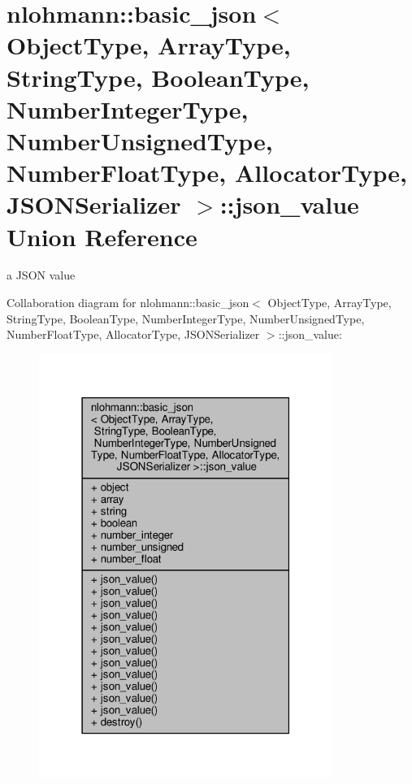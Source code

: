 \hypertarget{unionnlohmann_1_1basic__json_1_1json__value}{}\section{nlohmann\+:\+:basic\+\_\+json$<$ Object\+Type, Array\+Type, String\+Type, Boolean\+Type, Number\+Integer\+Type, Number\+Unsigned\+Type, Number\+Float\+Type, Allocator\+Type, J\+S\+O\+N\+Serializer $>$\+:\+:json\+\_\+value Union Reference}
\label{unionnlohmann_1_1basic__json_1_1json__value}


a J\+S\+ON value  




Collaboration diagram for nlohmann\+:\+:basic\+\_\+json$<$ Object\+Type, Array\+Type, String\+Type, Boolean\+Type, Number\+Integer\+Type, Number\+Unsigned\+Type, Number\+Float\+Type, Allocator\+Type, J\+S\+O\+N\+Serializer $>$\+:\+:json\+\_\+value\+:
\nopagebreak
\begin{figure}[H]
\begin{center}
\leavevmode
\includegraphics[width=271pt]{unionnlohmann_1_1basic__json_1_1json__value__coll__graph}
\end{center}
\end{figure}
